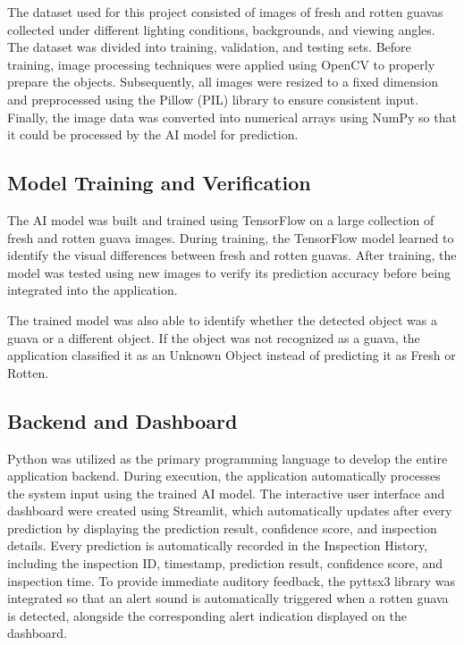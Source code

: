 The dataset used for this project consisted of images of fresh and rotten guavas collected under different lighting conditions, backgrounds, and viewing angles. The dataset was divided into training, validation, and testing sets. Before training, image processing techniques were applied using OpenCV to properly prepare the objects. Subsequently, all images were resized to a fixed dimension and preprocessed using the Pillow (PIL) library to ensure consistent input. Finally, the image data was converted into numerical arrays using NumPy so that it could be processed by the AI model for prediction.

\subsection{Model Training and Verification}

The AI model was built and trained using TensorFlow on a large collection of fresh and rotten guava images. During training, the TensorFlow model learned to identify the visual differences between fresh and rotten guavas. After training, the model was tested using new images to verify its prediction accuracy before being integrated into the application.

The trained model was also able to identify whether the detected object was a guava or a different object. If the object was not recognized as a guava, the application classified it as an Unknown Object instead of predicting it as Fresh or Rotten.

\subsection{Backend and Dashboard}

Python was utilized as the primary programming language to develop the entire application backend. During execution, the application automatically processes the system input using the trained AI model. The interactive user interface and dashboard were created using Streamlit, which automatically updates after every prediction by displaying the prediction result, confidence score, and inspection details. Every prediction is automatically recorded in the Inspection History, including the inspection ID, timestamp, prediction result, confidence score, and inspection time. To provide immediate auditory feedback, the pyttsx3 library was integrated so that an alert sound is automatically triggered when a rotten guava is detected, alongside the corresponding alert indication displayed on the dashboard.

